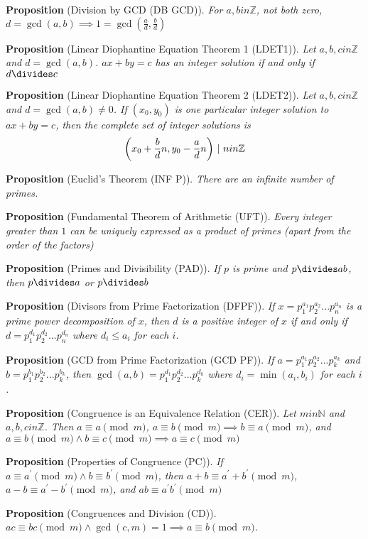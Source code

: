 \documentclass[12pt]{article}
\newcommand{\propositionlist}[2]{{\bf Proposition} (#1). \emph{#2}}
\begin{document}
\propositionlist{Division by GCD (DB GCD)}{For $a,b in \mathbb{Z}$, not both zero, $d = \gcd(a,b) \implies 1 = \gcd(\frac{a}{d},\frac{b}{d})$}

\propositionlist{Linear Diophantine Equation Theorem 1 (LDET1)}{Let $a,b,c in \mathbb{Z}$ and $d = \gcd(a,b)$. $ax + by = c$ has an integer solution if and only if $d \divides c$}

\propositionlist{Linear Diophantine Equation Theorem 2 (LDET2)}{Let $a,b,c in \mathbb{Z}$ and $d = \gcd(a,b) \neq 0$. If $(x_0,y_0)$ is one particular integer solution to $ax + by = c$, then the complete set of integer solutions is \[ \bigg( x_0 + \frac{b}{d}n, y_0 - \frac{a}{d}n \bigg) \ |\  n in \mathbb{Z} \]}

\propositionlist{Euclid's Theorem (INF P)}{There are an infinite number of primes.}

\propositionlist{Fundamental Theorem of Arithmetic (UFT)}{Every integer greater than $1$ can be uniquely expressed as a product of primes (apart from the order of the factors)}

\propositionlist{Primes and Divisibility (PAD)}{If $p$ is prime and $p \divides ab$, then $p \divides a$ or $p \divides b$}

\propositionlist{Divisors from Prime Factorization (DFPF)}{If $x = p_1^{a_1} p_2^{a_2} ... p_n^{a_n}$ is a prime power decomposition of $x$, then $d$ is a positive integer of $x$ if and only if $d = p_1^{d_1} p_2^{d_2} ... p_n^{d_n}$ where $d_i \leq a_i$ for each $i$.}

\propositionlist{GCD from Prime Factorization (GCD PF)}{If $a = p_1^{a_1} p_2^{a_2} ... p_k^{a_k}$ and $b = p_1^{b_1} p_2^{b_2} ... p_k^{b_k}$, then $\gcd(a,b) = p_1^{d_1} p_2^{d_2} ... p_k^{d_k}$ where $d_i = \min(a_i,b_i)$ for each $i$.}

\propositionlist{Congruence is an Equivalence Relation (CER)}{Let $m in \mathbb{N}$ and $a,b,c in \mathbb{Z}$. Then $a \equiv a \pmod m$, $a \equiv b \pmod m \implies b \equiv a \pmod m$, and $a \equiv b \pmod m \land b \equiv c \pmod m \implies a \equiv c \pmod m$}

\propositionlist{Properties of Congruence (PC)}{If $a \equiv a^\prime \pmod m \land b \equiv b^\prime \pmod m$, then $a + b \equiv a^\prime + b^\prime \pmod m$, $a - b \equiv a^\prime - b^\prime \pmod m$, and $ab \equiv a^\prime b^\prime \pmod m$}

\propositionlist{Congruences and Division (CD)}{$ac \equiv bc \pmod m \land \gcd(c,m) = 1 \implies a \equiv b \pmod m$.}
\end{document}
